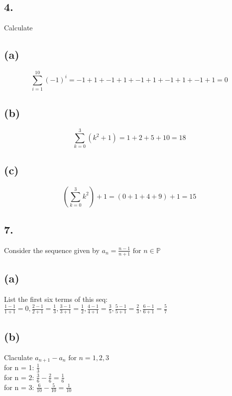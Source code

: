 \documentclass[11pt]{article}
\begin{document}
\subsection*{4.}
Calculate

\subsection*{(a)}
$$\sum_{i=1}^{10} (-1)^{i} = -1 + 1 + -1 + 1 + -1 + 1 + -1 + 1 + -1 + 1 = 0$$

\subsection*{(b)}
$$\sum_{k=0}^{3} (k^{2} + 1) = 1 + 2 + 5 + 10 = 18$$

\subsection*{(c)}
$$\left( \sum_{k=0}^{3} k^{2} \right) + 1 = (0 + 1 + 4 + 9  ) + 1 = 15$$
%
%
\subsection*{7.}
\begin{center}
Consider the sequence given by $a_{n} = \frac{n-1}{n+1} \text{ for } n \in \mathbb{P}$
\end{center}

\subsection*{(a)}
\begin{center}
List the first six terms of this seq:\\
\hfill \break
$\frac{1-1}{1+1} = 0, \frac{2-1}{2+1} = \frac{1}{3}, \frac{3-1}{3+1} = \frac{1}{2}, \frac{4-1}{4+1} = \frac{3}{5}, \frac{5-1}{5+1} = \frac{2}{3}, \frac{6-1}{6+1} = \frac{5}{7}$
\end{center}

\subsection*{(b)}
\begin{center}
Claculate $a_{n+1}-a_{n} \text{ for } n = 1, 2, 3$\\
\hfill \break
for n = 1: $\frac{1}{3}$\\
for n = 2: $\frac{3}{6}-\frac{2}{6} = \frac{1}{6}$\\
for n = 3: $\frac{6}{10}-\frac{5}{10} = \frac{1}{10}$\\
\end{center}
\end{document}
